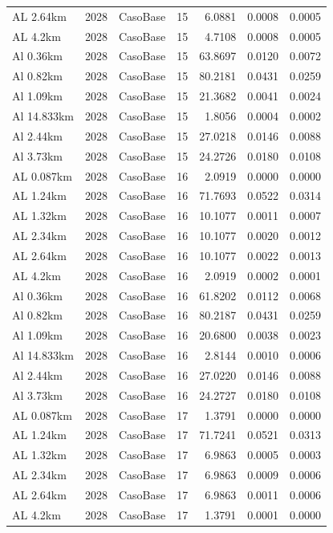 \documentclass[11pt,a4paper]{article}
\begin{document}
\begin{longtable}{llllrrr}
AL 2.64km & 2028 & CasoBase & 15 & 6.0881 & 0.0008 & 0.0005 \\
AL 4.2km & 2028 & CasoBase & 15 & 4.7108 & 0.0008 & 0.0005 \\
Al 0.36km & 2028 & CasoBase & 15 & 63.8697 & 0.0120 & 0.0072 \\
Al 0.82km & 2028 & CasoBase & 15 & 80.2181 & 0.0431 & 0.0259 \\
Al 1.09km & 2028 & CasoBase & 15 & 21.3682 & 0.0041 & 0.0024 \\
Al 14.833km & 2028 & CasoBase & 15 & 1.8056 & 0.0004 & 0.0002 \\
Al 2.44km & 2028 & CasoBase & 15 & 27.0218 & 0.0146 & 0.0088 \\
Al 3.73km & 2028 & CasoBase & 15 & 24.2726 & 0.0180 & 0.0108 \\
AL 0.087km & 2028 & CasoBase & 16 & 2.0919 & 0.0000 & 0.0000 \\
AL 1.24km & 2028 & CasoBase & 16 & 71.7693 & 0.0522 & 0.0314 \\
AL 1.32km & 2028 & CasoBase & 16 & 10.1077 & 0.0011 & 0.0007 \\
AL 2.34km & 2028 & CasoBase & 16 & 10.1077 & 0.0020 & 0.0012 \\
AL 2.64km & 2028 & CasoBase & 16 & 10.1077 & 0.0022 & 0.0013 \\
AL 4.2km & 2028 & CasoBase & 16 & 2.0919 & 0.0002 & 0.0001 \\
Al 0.36km & 2028 & CasoBase & 16 & 61.8202 & 0.0112 & 0.0068 \\
Al 0.82km & 2028 & CasoBase & 16 & 80.2187 & 0.0431 & 0.0259 \\
Al 1.09km & 2028 & CasoBase & 16 & 20.6800 & 0.0038 & 0.0023 \\
Al 14.833km & 2028 & CasoBase & 16 & 2.8144 & 0.0010 & 0.0006 \\
Al 2.44km & 2028 & CasoBase & 16 & 27.0220 & 0.0146 & 0.0088 \\
Al 3.73km & 2028 & CasoBase & 16 & 24.2727 & 0.0180 & 0.0108 \\
AL 0.087km & 2028 & CasoBase & 17 & 1.3791 & 0.0000 & 0.0000 \\
AL 1.24km & 2028 & CasoBase & 17 & 71.7241 & 0.0521 & 0.0313 \\
AL 1.32km & 2028 & CasoBase & 17 & 6.9863 & 0.0005 & 0.0003 \\
AL 2.34km & 2028 & CasoBase & 17 & 6.9863 & 0.0009 & 0.0006 \\
AL 2.64km & 2028 & CasoBase & 17 & 6.9863 & 0.0011 & 0.0006 \\
AL 4.2km & 2028 & CasoBase & 17 & 1.3791 & 0.0001 & 0.0000 \\

\end{longtable}
\end{document}
